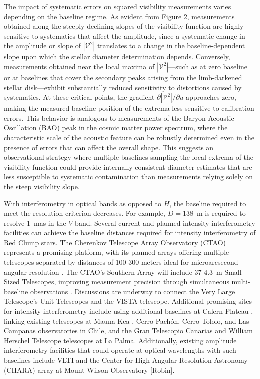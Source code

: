 \documentclass[linenumbers,trackchanges]{aastex701}
\begin{document}
The impact of systematic errors on squared visibility measurements varies  depending on the baseline regime. As evident from Figure 2, measurements obtained along the steeply declining slopes of the visibility function are highly sensitive to systematics that affect the amplitude, since a systematic change in the amplitude or slope of $|\mathcal{V}^2|$ translates to a change in the baseline-dependent slope upon which the stellar diameter determination depends. Conversely, measurements obtained near the local maxima of  $|\mathcal{V}^2|$—such as at zero baseline or at baselines that
cover the secondary peaks arising from the limb-darkened stellar disk—exhibit substantially reduced sensitivity to distortions caused by systematics. At these critical points, the gradient $\partial |\mathcal{V}^2|/\partial u$ approaches zero, making the measured baseline position of the extrema less sensitive to calibration errors. This behavior is analogous to measurements of the Baryon Acoustic Oscillation (BAO) peak in the cosmic matter power spectrum, where the characteristic scale of the acoustic feature can be robustly determined even in the presence of errors that can affect the overall shape. This suggests an observational strategy where multiple baselines sampling the local extrema of the visibility function could provide internally consistent diameter estimates that are less susceptible to systematic contamination than measurements relying solely on the steep visibility slope.

With interferometry in optical bands as opposed to $H$, the baseline required to meet
the resolution criterion decreases.   For example, $D=138$~m is
required to resolve 1~mas in the $V$-band.
Several current and planned intensity interferometry facilities can achieve the baseline distances required for intensity interferometry of Red Clump stars. The Cherenkov Telescope Array Observatory (CTAO) represents a promising platform, with its planned arrays offering multiple telescopes separated by distances of 100-300 meters ideal for microarcsecond angular resolution \citep{2024SPIE13095E..27C}. The CTAO's Southern Array will include 37 4.3~m Small-Sized Telescopes,  improving measurement precision through simultaneous multi-baseline observations \citep{2024MNRAS.529.4387A}. 
Discussions are underway to connect the Very Large Telescope's Unit Telescopes and the VISTA telescope.
Additional promising sites for intensity interferometry include using additional baselines at Calern
Plateau \citep{2022SPIE12183E..0GM}, linking existing telescopes
at Mauna Kea \citep{presentation_kaiser},
Cerro Pach\'{o}n, Cerro Tololo, and Las Campanas observatories in Chile, and the  Gran Telescopio Canarias and William Herschel Telescope telescopes at La Palma.
Additionally, existing amplitude interferometry facilities that could operate at optical wavelengths with such baselines include VLTI and the Center for High Angular Resolution Astronomy (CHARA) array at Mount Wilson Observatory \citep{2005ApJ...628..453T,2020SPIE11446E..05S} [Robin].
\end{document}
